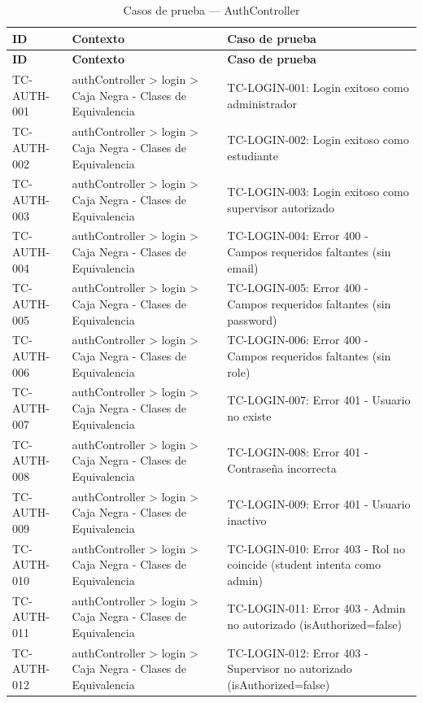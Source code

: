 \begin{longtable}{l L{0.30\textwidth} L{0.40\textwidth}}
\caption{Casos de prueba --- AuthController}\label{tab:cat-tc-auth}\\
\toprule \textbf{ID} & \textbf{Contexto} & \textbf{Caso de prueba} \\ \midrule
\endfirsthead
\toprule \textbf{ID} & \textbf{Contexto} & \textbf{Caso de prueba} \\ \midrule
\endhead \bottomrule \endlastfoot
TC-AUTH-001 & authController > login > Caja Negra - Clases de Equivalencia & TC-LOGIN-001: Login exitoso como administrador \\
TC-AUTH-002 & authController > login > Caja Negra - Clases de Equivalencia & TC-LOGIN-002: Login exitoso como estudiante \\
TC-AUTH-003 & authController > login > Caja Negra - Clases de Equivalencia & TC-LOGIN-003: Login exitoso como supervisor autorizado \\
TC-AUTH-004 & authController > login > Caja Negra - Clases de Equivalencia & TC-LOGIN-004: Error 400 - Campos requeridos faltantes (sin email) \\
TC-AUTH-005 & authController > login > Caja Negra - Clases de Equivalencia & TC-LOGIN-005: Error 400 - Campos requeridos faltantes (sin password) \\
TC-AUTH-006 & authController > login > Caja Negra - Clases de Equivalencia & TC-LOGIN-006: Error 400 - Campos requeridos faltantes (sin role) \\
TC-AUTH-007 & authController > login > Caja Negra - Clases de Equivalencia & TC-LOGIN-007: Error 401 - Usuario no existe \\
TC-AUTH-008 & authController > login > Caja Negra - Clases de Equivalencia & TC-LOGIN-008: Error 401 - Contraseña incorrecta \\
TC-AUTH-009 & authController > login > Caja Negra - Clases de Equivalencia & TC-LOGIN-009: Error 401 - Usuario inactivo \\
TC-AUTH-010 & authController > login > Caja Negra - Clases de Equivalencia & TC-LOGIN-010: Error 403 - Rol no coincide (student intenta como admin) \\
TC-AUTH-011 & authController > login > Caja Negra - Clases de Equivalencia & TC-LOGIN-011: Error 403 - Admin no autorizado (isAuthorized=false) \\
TC-AUTH-012 & authController > login > Caja Negra - Clases de Equivalencia & TC-LOGIN-012: Error 403 - Supervisor no autorizado (isAuthorized=false) \\

\end{longtable}
